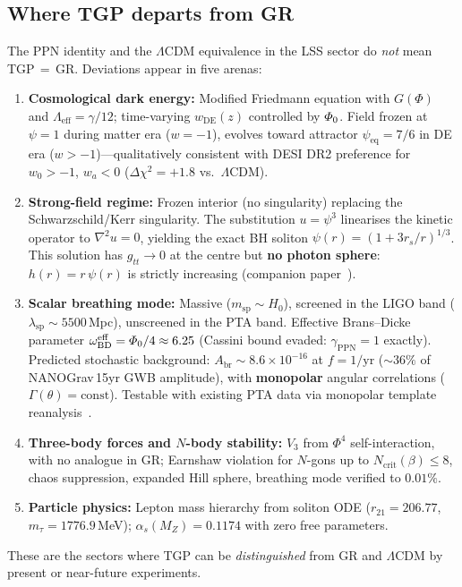 \subsection{Where TGP departs from GR}\label{ssec:departures}

The PPN identity and the $\Lambda$CDM equivalence in the LSS sector
do \emph{not} mean TGP\,$=$\,GR.
Deviations appear in five arenas:

\begin{enumerate}[nosep]
  \item \textbf{Cosmological dark energy:}
        Modified Friedmann equation with $G(\Phi)$ and
        $\Lambda_{\mathrm{eff}}=\gamma/12$; time-varying
        $w_{\mathrm{DE}}(z)$ controlled by $\varPhi_0$.
        Field frozen at $\psi = 1$ during matter era ($w = -1$),
        evolves toward attractor $\psi_{\mathrm{eq}} = 7/6$ in
        DE era ($w > -1$)---qualitatively consistent with
        DESI DR2 preference for $w_0 > -1$, $w_a < 0$
        ($\Delta\chi^{2}=+1.8$ vs.\ $\Lambda$CDM).

  \item \textbf{Strong-field regime:}
        Frozen interior (no singularity) replacing the
        Schwarzschild/Kerr singularity.  The substitution
        $u = \psi^{3}$ linearises the kinetic operator to
        $\nabla^{2}u = 0$, yielding the exact BH soliton
        $\psi(r) = (1 + 3r_{s}/r)^{1/3}$.  This solution has
        $g_{tt}\to 0$ at the centre but \textbf{no photon sphere}:
        $h(r) = r\,\psi(r)$ is strictly increasing
        (companion paper~\cite{TGP-repo}).

  \item \textbf{Scalar breathing mode:}
        Massive ($m_{\mathrm{sp}}\sim H_{0}$), screened in the
        LIGO band ($\lambda_{\mathrm{sp}} \sim 5500$\,Mpc), unscreened
        in the PTA band.
        Effective Brans--Dicke parameter
        $\omega_{\mathrm{BD}}^{\mathrm{eff}} = \varPhi_0/4 \approx 6.25$
        (Cassini bound evaded: $\gamma_{\mathrm{PPN}}=1$ exactly).
        Predicted stochastic background:
        $A_{\mathrm{br}} \sim 8.6\times 10^{-16}$ at $f = 1/\mathrm{yr}$
        ($\sim 36\%$ of NANOGrav\,15yr GWB amplitude),
        with \textbf{monopolar} angular correlations
        ($\Gamma(\theta) = \mathrm{const}$).
        Testable with existing PTA data via monopolar template
        reanalysis~\cite{NANOGrav-15yr-ST}.

  \item \textbf{Three-body forces and $N$-body stability:}
        $V_{3}$ from $\Phi^{4}$ self-interaction, with no analogue
        in GR; Earnshaw violation for $N$-gons up to
        $N_{\mathrm{crit}}(\beta)\leq 8$, chaos suppression,
        expanded Hill sphere, breathing mode verified to $0.01\%$.

  \item \textbf{Particle physics:}
        Lepton mass hierarchy from soliton ODE
        ($r_{21}=206.77$, $m_{\tau}=1776.9$\,MeV);
        $\alpha_{s}(M_{Z})=0.1174$ with zero free parameters.
\end{enumerate}

\noindent
These are the sectors where TGP can be \emph{distinguished} from
GR and $\Lambda$CDM by present or near-future experiments.
